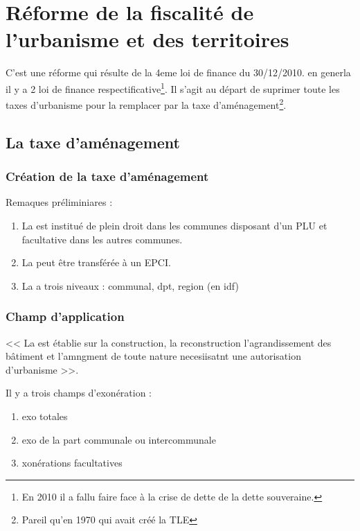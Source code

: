 
\chapter{Réforme de la fiscalité de l’urbanisme et des territoires}

	C'est une réforme qui résulte de la 4eme loi de finance du 30/12/2010. en generla il y a 2 loi de finance respectificative\footnote{En 2010 il a fallu faire face à la crise de dette de la dette souveraine.}. Il s'agit au départ de suprimer toute les taxes d'urbanisme pour la remplacer par la taxe d'aménagement\footnote{Pareil qu'en 1970 qui avait créé la TLE}.

\section{La taxe d’aménagement}

	\subsection{Création de la taxe d’aménagement}

		Remaques préliminiares :
		\begin{enumerate}
			\item La \TA est institué de plein droit dans les communes disposant d'un PLU et facultative dans les autres communes.
			\item La \TA peut être transférée à un EPCI.
			\item La \TA a trois niveaux : communal, dpt, region (en idf)
		\end{enumerate}

	\subsection{Champ d’application}

		<< La \TA est établie sur la construction, la reconstruction l'agrandissement des bâtiment et l'amngment de toute nature necesiisatnt une autorisation d'urbanisme >>.

		Il y a trois champs d'exonération :
		\begin{enumerate}
			\item exo totales
			\item exo de la part communale ou intercommunale
			\item xonérations facultatives
		\end{enumerate}

